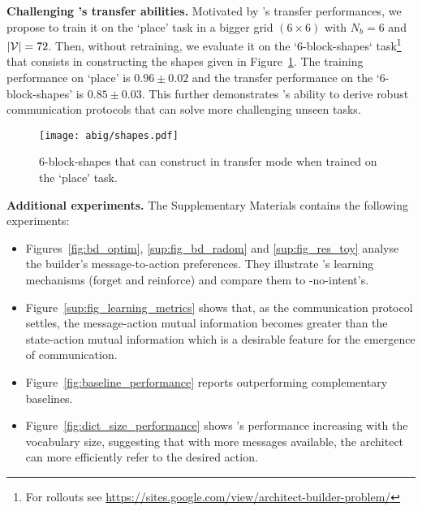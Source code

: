\textbf{Challenging \abim's transfer abilities. } Motivated by \abig's transfer performances, we propose to train it on the `place' task in a bigger grid $(6\times6)$ with $N_b=6$ and $|{\mathcal{V}}|=72$. Then, without retraining, we evaluate it on the `6-block-shapes` task\footnote{For rollouts see \small{\url{ https://sites.google.com/view/architect-builder-problem/}}} that consists in constructing the shapes given in Figure~\ref{fig:more_shapes}. The training performance on `place' is $0.96 \pm 0.02$ and the transfer performance on the `6-block-shapes' is $0.85\pm0.03$. This further demonstrates \abig's ability to derive robust communication protocols that can solve more challenging unseen tasks.   
\begin{figure}[!h]
    \centering
    \texttt{[image: abig/shapes.pdf]}
    \caption{6-block-shapes that \abim can construct in transfer mode when trained on the `place' task.}
    \label{fig:more_shapes}
\end{figure}
\vspace{-.1cm}
\textbf{Additional experiments.} The Supplementary Materials contains the following experiments:
\vspace{-.1cm}
\begin{itemize}[noitemsep]
    \item Figures~\ref{fig:bd_optim}, \ref{sup:fig_bd_radom} and \ref{sup:fig_res_toy}  analyse the builder’s message-to-action preferences. They illustrate \abim's learning mechanisms (forget and reinforce) and compare them to \abim-no-intent's.
    \item Figure~\ref{sup:fig_learning_metrics} %
    shows that, as the communication protocol settles, the message-action mutual information becomes greater than the state-action mutual information which is a desirable feature for the emergence of communication.
    \item Figure~\ref{fig:baseline_performance} reports \abim outperforming complementary baselines. 
    \item Figure~\ref{fig:dict_size_performance} shows \abim's performance increasing with the vocabulary size, suggesting that with more messages available, the architect can more efficiently refer to the desired action.
\end{itemize}

